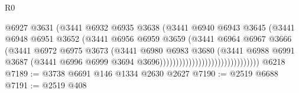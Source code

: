 \begin{lexlean}{R0}
\begin{coremodule}
                                                @6927
                                                @3631
                                                (@3441
                                                  @6932
                                                  @6935
                                                  @3638
                                                  (@3441
                                                    @6940
                                                    @6943
                                                    @3645
                                                    (@3441
                                                      @6948
                                                      @6951
                                                      @3652
                                                      (@3441
                                                        @6956
                                                        @6959
                                                        @3659
                                                        (@3441
                                                          @6964
                                                          @6967
                                                          @3666
                                                          (@3441
                                                            @6972
                                                            @6975
                                                            @3673
                                                            (@3441
                                                              @6980
                                                              @6983
                                                              @3680
                                                              (@3441
                                                                @6988
                                                                @6991
                                                                @3687
                                                                (@3441
                                                                  @6996
                                                                  @6999
                                                                  @3694
                                                                  @3696)))))))))))))))))))))))))))))))
    @6218
@7189 := @3738 @6691 @146 @1334 @2630 @2627
@7190 := @2519 @6688
@7191 := @2519 @408

\end{coremodule}
\end{lexlean}
